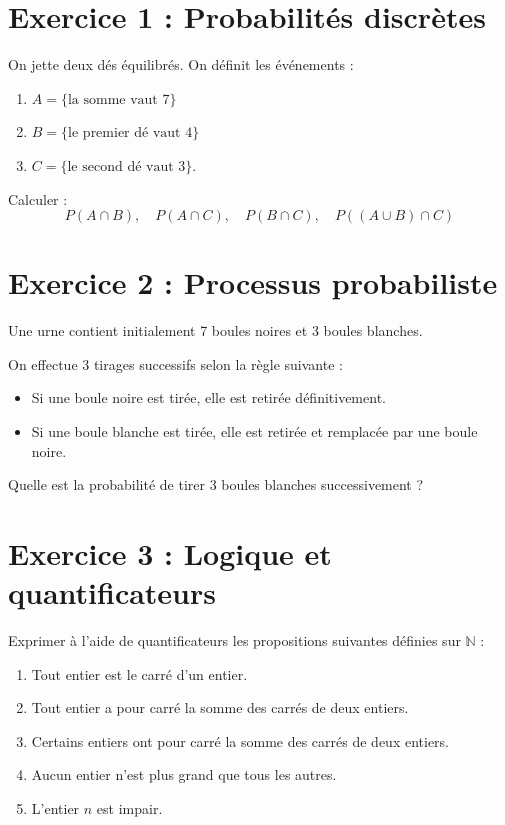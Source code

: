 \documentclass[12pt,a4paper]{article}
\begin{document}
\vspace{0.5cm}

\section*{Exercice 1 : Probabilités discrètes}

On jette deux dés équilibrés. On définit les événements :
\begin{enumerate}
    \item \(A = \{\text{la somme vaut 7}\}\)
    \item \(B = \{\text{le premier dé vaut 4}\}\)
    \item \(C = \{\text{le second dé vaut 3}\}.\)
\end{enumerate}
Calculer :
\[
P(A \cap B), \quad P(A \cap C), \quad P(B \cap C), \quad P((A \cup B) \cap C)
\]

\section*{Exercice 2 : Processus probabiliste}

Une urne contient initialement 7 boules noires et 3 boules blanches.

On effectue 3 tirages successifs selon la règle suivante :
\begin{itemize}
    \item Si une boule noire est tirée, elle est retirée définitivement.
    \item Si une boule blanche est tirée, elle est retirée et remplacée par une boule noire.
\end{itemize}

Quelle est la probabilité de tirer 3 boules blanches successivement ?

\section*{Exercice 3 : Logique et quantificateurs}

Exprimer à l’aide de quantificateurs les propositions suivantes définies sur $\mathbb{N}$ :

\begin{enumerate}
    \item Tout entier est le carré d’un entier.
    \item Tout entier a pour carré la somme des carrés de deux entiers.
    \item Certains entiers ont pour carré la somme des carrés de deux entiers.
    \item Aucun entier n’est plus grand que tous les autres.
    \item L’entier $n$ est impair.
\end{enumerate}
\end{document}
